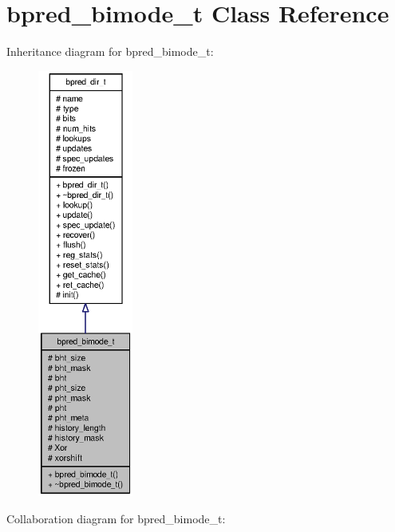 \section{bpred\_\-bimode\_\-t Class Reference}
\label{classbpred__bimode__t}
Inheritance diagram for bpred\_\-bimode\_\-t:\nopagebreak
\begin{figure}[H]
\begin{center}
\leavevmode
\includegraphics[height=400pt]{classbpred__bimode__t__inherit__graph}
\end{center}
\end{figure}
Collaboration diagram for bpred\_\-bimode\_\-t:\nopagebreak
